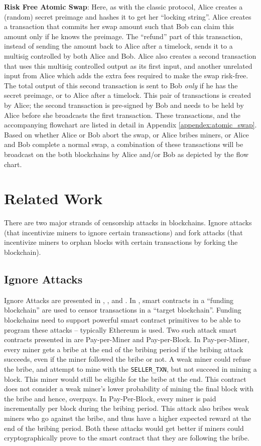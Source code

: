 \documentclass[runningheads]{llncs}
\newcommand{\sellertxn}{\texttt{SELLER\_TXN}}
\begin{document}
\textbf{Risk Free Atomic Swap}: Here, as with the classic protocol, Alice creates a (random) secret preimage and hashes it to get her ``locking string''. Alice creates a transaction that commits her swap amount such that Bob can claim this amount only if he knows the preimage. The ``refund'' part of this transaction, instead of sending the amount back to Alice after a timelock, sends it to a multisig controlled by both Alice and Bob. Alice also creates a second transaction that uses this multisig controlled output as its first input, and another unrelated input from Alice which adds the extra fees required to make the swap risk-free. The total output of this second transaction is sent to Bob \textit{only} if he has the secret preimage, or to Alice after a timelock. This pair of transactions is created by Alice; the second transaction is pre-signed by Bob and needs to be held by Alice before she broadcasts the first transaction. These transactions, and the accompanying flowchart are listed in detail in Appendix \ref{appendex:atomic_swap}. Based on whether Alice or Bob abort the swap, or Alice bribes miners, or Alice and Bob complete a normal swap, a combination of these transactions will be broadcast on the both blockchains by Alice and/or Bob as depicted by the flow chart.

\section{Related Work}
There are two major strands of censorship attacks in blockchains. Ignore attacks (that incentivize miners to ignore certain transactions) and fork attacks (that incentivize miners to orphan blocks with certain transactions by forking the blockchain).

\subsection{Ignore Attacks}
Ignore Attacks are presented in \cite{temporary_censorship_attack_ethereum}, \cite{pay_to_win}, and \cite{mad_htlc}. In \cite{temporary_censorship_attack_ethereum}, smart contracts in a ``funding blockchain'' are used to censor transactions in a ``target blockchain''. Funding blockchains need to support powerful smart contract primitives to be able to program these attacks -- typically Ethereum is used. Two such attack smart contracts presented in \cite{temporary_censorship_attack_ethereum} are Pay-per-Miner and Pay-per-Block. In Pay-per-Miner, every miner gets a bribe at the end of the bribing period if the bribing attack succeeds, even if the miner followed the bribe or not. A weak miner could refuse the bribe, and attempt to mine with the \sellertxn{}, but not succeed in mining a block. This miner would still be eligible for the bribe at the end. This contract does not consider a weak miner's lower probability of mining the final block with the bribe and hence, overpays. In Pay-Per-Block, every miner is paid incrementally per block during the bribing period. This attack also bribes weak miners who go against the bribe, and thus have a higher expected reward at the end of the bribing period. Both these attacks would get better if miners could cryptographically prove to the smart contract that they are following the bribe.
\end{document}
